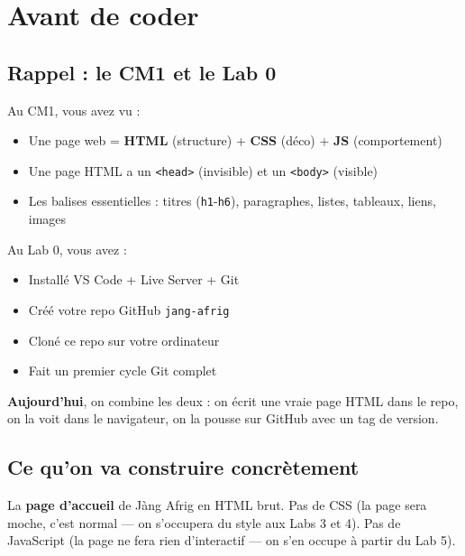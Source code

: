 \documentclass[11pt,a4paper]{article}
\begin{document}
\tableofcontents

\newpage

\section{Avant de coder}

\subsection{Rappel : le CM1 et le Lab 0}

Au CM1, vous avez vu :
\begin{itemize}[nosep]
    \item Une page web = \textbf{HTML} (structure) + \textbf{CSS} (déco) + \textbf{JS} (comportement)
    \item Une page HTML a un \texttt{<head>} (invisible) et un \texttt{<body>} (visible)
    \item Les balises essentielles : titres (\texttt{h1}-\texttt{h6}), paragraphes, listes, tableaux, liens, images
\end{itemize}

Au Lab 0, vous avez :
\begin{itemize}[nosep]
    \item Installé VS Code + Live Server + Git
    \item Créé votre repo GitHub \texttt{jang-afrig}
    \item Cloné ce repo sur votre ordinateur
    \item Fait un premier cycle Git complet
\end{itemize}

\textbf{Aujourd'hui}, on combine les deux : on écrit une vraie page HTML
dans le repo, on la voit dans le navigateur, on la pousse sur GitHub avec
un tag de version.

\subsection{Ce qu'on va construire concrètement}

La \textbf{page d'accueil} de Jàng Afrig en HTML brut. Pas de CSS (la page
sera moche, c'est normal --- on s'occupera du style aux Labs 3 et 4). Pas
de JavaScript (la page ne fera rien d'interactif --- on s'en occupe à
partir du Lab 5).
\end{document}
